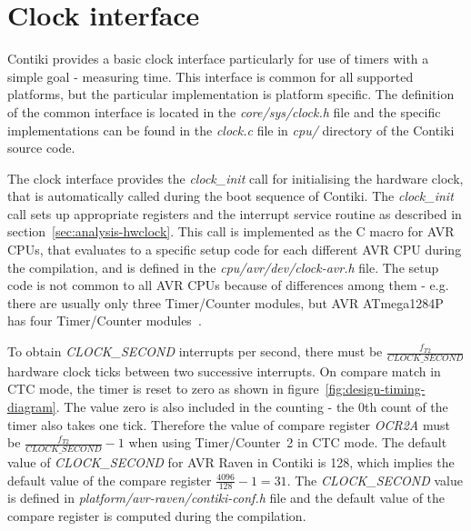 
\section{Clock interface}
Contiki provides a basic clock interface particularly for use of timers
with a simple goal - measuring time.
This interface is common for all supported platforms,
but the particular implementation is platform specific.
The definition of the common interface is located in the {\it{core/sys/clock.h}} file
and the specific implementations can be found in the {\it{clock.c}} file
in {\it{cpu/}} directory of the Contiki source code.

The clock interface provides the {\it{clock\_init}} call for initialising the hardware clock,
that is automatically called during the boot sequence of Contiki.
The {\it{clock\_init}} call sets up
appropriate registers and the interrupt service routine as described in section~\ref{sec:analysis-hwclock}.
This call is implemented as the C macro for AVR CPUs, that evaluates to a specific setup code for each
different AVR CPU during the compilation, and is defined in the {\it{cpu/avr/dev/clock-avr.h}} file.
The setup code is not common to all AVR CPUs because of differences among them - e.g. there are usually
only three Timer/Counter modules, but AVR ATmega1284P has four Timer/Counter modules~\cite{avr-datasheet}.

To obtain {\it{CLOCK\_SECOND}} interrupts per second, there must be
${\frac{f_{T2}}{CLOCK\_SECOND}}$ hardware clock ticks between two successive interrupts.
On compare match in CTC mode, the timer is reset to zero as
shown in figure~\ref{fig:design-timing-diagram}.
The value zero is also included in the counting - the 0th count of the timer also takes one tick.
Therefore the value of compare register {\it{OCR2A}} must be ${\frac{f_{T2}}{CLOCK\_SECOND}} - 1$
when using Timer/Counter~2 in CTC mode.
The default value of {\it{CLOCK\_SECOND}} for AVR Raven in Contiki is 128,
which implies the default value of the compare register ${\frac{4096}{128}} - 1 = 31$.
The {\it{CLOCK\_SECOND}} value is defined in {\it{platform/avr-raven/contiki-conf.h}} file
and the default value of the compare register is computed during the compilation.

